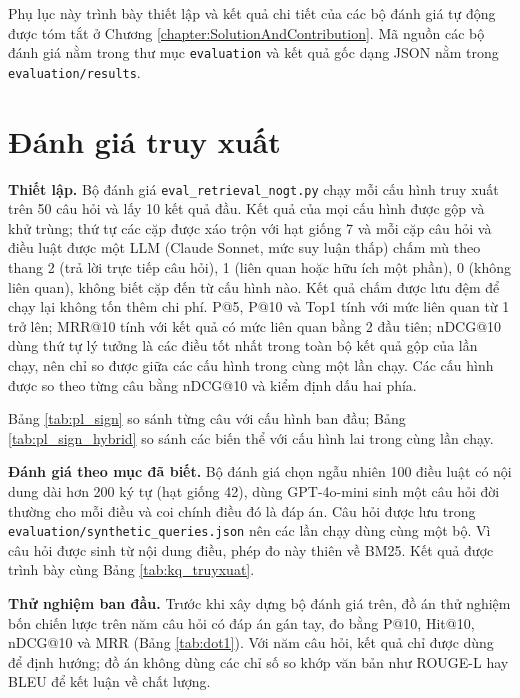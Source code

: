 \documentclass[../DoAn.tex]{subfiles}
\begin{document}
Phụ lục này trình bày thiết lập và kết quả chi tiết của các bộ đánh giá tự động được tóm tắt ở Chương \ref{chapter:SolutionAndContribution}. Mã nguồn các bộ đánh giá nằm trong thư mục \texttt{evaluation} và kết quả gốc dạng JSON nằm trong \texttt{evaluation/\allowbreak{}results}.

\section{Đánh giá truy xuất}
\textbf{Thiết lập.} Bộ đánh giá \texttt{eval\_retrieval\_nogt.py} chạy mỗi cấu hình truy xuất trên 50 câu hỏi và lấy 10 kết quả đầu. Kết quả của mọi cấu hình được gộp và khử trùng; thứ tự các cặp được xáo trộn với hạt giống 7 và mỗi cặp câu hỏi và điều luật được một LLM (Claude Sonnet, mức suy luận thấp) chấm mù theo thang 2 (trả lời trực tiếp câu hỏi), 1 (liên quan hoặc hữu ích một phần), 0 (không liên quan), không biết cặp đến từ cấu hình nào. Kết quả chấm được lưu đệm để chạy lại không tốn thêm chi phí. P@5, P@10 và Top1 tính với mức liên quan từ 1 trở lên; MRR@10 tính với kết quả có mức liên quan bằng 2 đầu tiên; nDCG@10 dùng thứ tự lý tưởng là các điều tốt nhất trong toàn bộ kết quả gộp của lần chạy, nên chỉ so được giữa các cấu hình trong cùng một lần chạy. Các cấu hình được so theo từng câu bằng nDCG@10 và kiểm định dấu hai phía.

Bảng \ref{tab:pl_sign} so sánh từng câu với cấu hình ban đầu; Bảng \ref{tab:pl_sign_hybrid} so sánh các biến thể với cấu hình lai trong cùng lần chạy.





\textbf{Đánh giá theo mục đã biết.} Bộ đánh giá chọn ngẫu nhiên 100 điều luật có nội dung dài hơn 200 ký tự (hạt giống 42), dùng GPT-4o-mini sinh một câu hỏi đời thường cho mỗi điều và coi chính điều đó là đáp án. Câu hỏi được lưu trong \texttt{evaluation/\allowbreak{}synthetic\_queries.json} nên các lần chạy dùng cùng một bộ. Vì câu hỏi được sinh từ nội dung điều, phép đo này thiên về BM25. Kết quả được trình bày cùng Bảng \ref{tab:kq_truyxuat}.

\textbf{Thử nghiệm ban đầu.} Trước khi xây dựng bộ đánh giá trên, đồ án thử nghiệm bốn chiến lược trên năm câu hỏi có đáp án gán tay, đo bằng P@10, Hit@10, nDCG@10 và MRR (Bảng \ref{tab:dot1}). Với năm câu hỏi, kết quả chỉ được dùng để định hướng; đồ án không dùng các chỉ số so khớp văn bản như ROUGE-L hay BLEU để kết luận về chất lượng.
\end{document}
